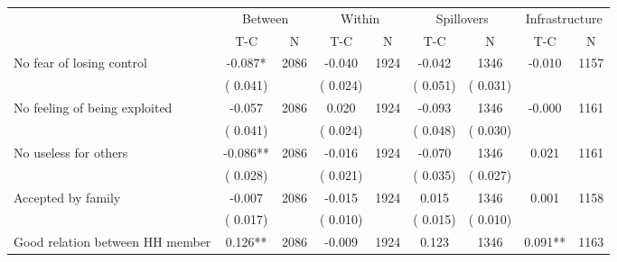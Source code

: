 
\begin{tabular}{l*{8}{c}}\hline&\multicolumn{2}{c}{Between}&\multicolumn{2}{c}{Within}&\multicolumn{2}{c}{Spillovers}&\multicolumn{2}{c}{Infrastructure}\\ \cmidrule(r){2-3}\cmidrule(l){4-5}\cmidrule(l){6-7}\cmidrule(l){8-9} & {T-C} & {N} & {T-C} & {N}  & {T-C}  & {N} & {T-C}  & {N} \\ \midrule
No fear of losing control        &             -0.087*      &       2086       &             -0.040      &       1924       &             -0.042      &       1346  &       -0.010 &       1157       \\
                       &       (       0.041)            &                               &       (       0.024)            &                               &       (       0.051)            &       (       0.031) &                  \\
No feeling of being exploited        &             -0.057      &       2086       &              0.020      &       1924       &             -0.093      &       1346  &       -0.000 &       1161       \\
                       &       (       0.041)            &                               &       (       0.024)            &                               &       (       0.048)            &       (       0.030) &                  \\
No useless for others        &             -0.086**      &       2086       &             -0.016      &       1924       &             -0.070      &       1346  &        0.021 &       1161       \\
                       &       (       0.028)            &                               &       (       0.021)            &                               &       (       0.035)            &       (       0.027) &                  \\
Accepted by family        &             -0.007      &       2086       &             -0.015      &       1924       &              0.015      &       1346  &        0.001 &       1158       \\
                       &       (       0.017)            &                               &       (       0.010)            &                               &       (       0.015)            &       (       0.010) &                  \\
Good relation between HH member        &              0.126**      &       2086       &             -0.009      &       1924       &              0.123      &       1346  &        0.091** &       1163       \\

\end{tabular}
